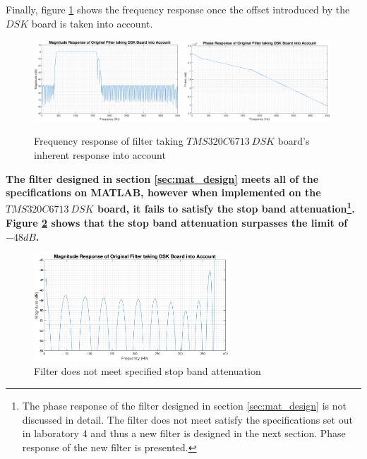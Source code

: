 \documentclass{article}
\begin{document}
Finally, figure \ref{fig:old_filter_subtracted} shows the frequency response once the offset introduced by the $DSK$ board is taken into account.

\begin{figure}[H]
    \centering
    \includegraphics[width=0.49\textwidth]{dsk_mag_original_filter_after_subtracting}
    \includegraphics[width=0.49\textwidth]{dsk_phase_original_filter_after_subtracting}
    \caption{Frequency response of filter taking  $TMS320C6713 \ DSK$ board's inherent response into account}
    \label{fig:old_filter_subtracted}
\end{figure}

\newpage
\textbf{The filter designed in section \ref{sec:mat_design} meets all of the specifications on MATLAB, however when implemented on the $TMS320C6713 \ DSK$ board, it fails to satisfy the stop band attenuation\footnote{The phase response of the filter designed in section \ref{sec:mat_design} is not discussed in detail. The filter does not meet satisfy the specifications set out in laboratory 4 and thus a new filter is designed in the next section. Phase response of the new filter is presented.}. Figure \ref{fig:old_failed} shows that the stop band attenuation surpasses the limit of $-48dB$.}

\begin{figure}[H]
    \centering
    \includegraphics[width=0.65\textwidth]{dsk_mag_original_filter_after_subtracting_artefact}
    \caption{Filter does not meet specified stop band attenuation}
    \label{fig:old_failed}
\end{figure}
\end{document}
